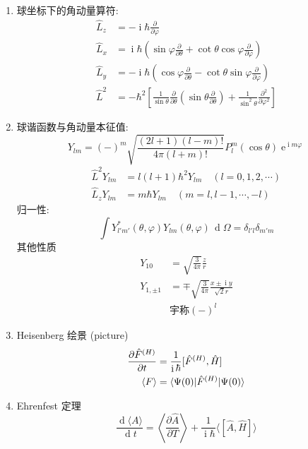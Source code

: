 \documentclass[11pt,a4paper,twocolumn,fleqn]{article}%
\DeclareMathOperator{\dif}{d}
\DeclareMathOperator{\diff}{\, d}
\DeclareMathOperator{\mi}{i}
\DeclareMathOperator{\e}{e}%
\renewcommand{\[}{~$}
\renewcommand{\]}{$~}%
\begin{document}
\begin{enumerate}
  \item 球坐标下的角动量算符: 
  	\begin{align}
  	 \hat L_z &= -\mi\hbar\frac{\partial }{\partial\varphi} \\
  	 \hat L_x &= \mi\hbar\left(\sin\varphi\frac{\partial}{\partial\theta} + \cot\theta\cos\varphi\frac{\partial}{\partial \varphi}\right) \\
  	 \hat L_y &= -\mi\hbar\left(\cos\varphi\frac{\partial}{\partial\theta} - \cot\theta\sin\varphi\frac{\partial}{\partial \varphi}\right) \\
  	 \hat L^2 &= -\hbar^2 \left[\frac{1}{\sin\theta}\frac{\partial}{\partial\theta}\left(\sin\theta\frac{\partial }{\partial \theta}\right) + \frac{1}{\sin^2\theta}\frac{\partial ^2}{\partial\varphi^2}\right]
  	\end{align}
  \item 球谐函数与角动量本征值:
  	\begin{equation}
  	 Y_{lm} = (-)^m\sqrt{\frac{(2l+1)(l-m)!}{4\pi(l+m)!}}P_l^m(\cos\theta)\e^{\mi m\varphi}
  	\end{equation}
  	\begin{align}
  	 \hat L^2 Y_{lm} &= l(l+1) \hbar^2 Y_{lm} \quad(l = 0,1,2,\cdots)\\
  	 \hat L_z Y_{lm} &= m \hbar Y_{lm} \quad(m = l, l-1, \cdots , -l)
  	\end{align}
  	归一性: 
  	\begin{equation}
  	 \int Y^*_{l'm'}(\theta,\varphi)Y_{lm}(\theta,\varphi)\diff\Omega = \delta_{l'l}\delta_{m'm}
  	\end{equation}
  	其他性质
  	\begin{align}
  	 Y_{10} &= \sqrt{\frac{3}{4\pi}}\frac{z}{r} \\
  	 Y_{1,\pm 1} &= \mp\sqrt{\frac{3}{4\pi}}\frac{x\pm\mi y}{\sqrt 2 r} \\
  	 &\mbox{宇称}(-)^l
  	\end{align}
  \item Heisenberg 绘景 (picture)
  	\begin{align}
  	 \frac{\partial \hat F^{(H)}}{\partial t} &= \frac{1}{\mi\hbar}[\hat F^{(H)},\hat H] \\
  	 \langle F\rangle &= \braket{\Psi(0)|\hat F^{(H)}|\Psi(0)}
  	\end{align}
  \item Ehrenfest 定理
  	\begin{equation}
  	 \frac{\dif \langle A\rangle}{\dif t} = \left\langle\frac{\partial \hat A}{\partial T}\right\rangle + \frac{1}{\mi\hbar}\langle[\hat A,\hat H]\rangle

\end{equation}
\end{enumerate}
\end{document}
